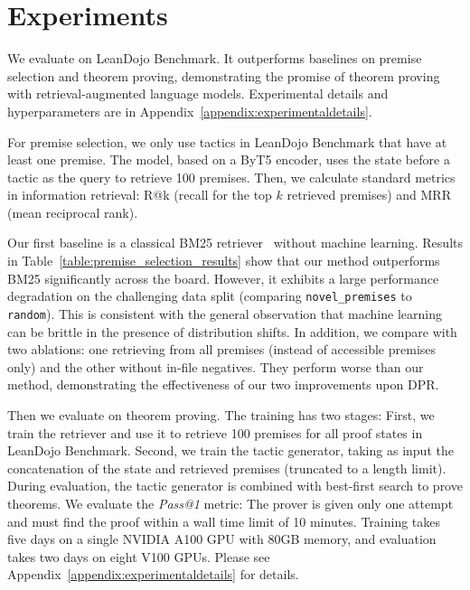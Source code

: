 
\section{Experiments}
\label{sec:experiments}

We evaluate {\name} on LeanDojo Benchmark. It outperforms baselines on premise selection and theorem proving, demonstrating the promise of theorem proving with retrieval-augmented language models. Experimental details and hyperparameters are in Appendix~\ref{appendix:experimentaldetails}.



For premise selection, we only use tactics in LeanDojo Benchmark that have at least one premise. The model, based on a ByT5 encoder, uses the state before a tactic as the query to retrieve 100 premises. Then, we calculate standard metrics in information retrieval: R@k (recall for the top $k$ retrieved premises) and MRR (mean reciprocal rank). 


Our first baseline is a classical BM25 retriever~\cite{robertson2009probabilistic} without machine learning. Results in Table~\ref{table:premise_selection_results} show that our method outperforms BM25 significantly across the board. However, it exhibits a large performance degradation on the challenging data split (comparing \texttt{novel\_premises} to \texttt{random}). This is consistent with the general observation that machine learning can be brittle in the presence of distribution shifts. In addition, we compare with two ablations: one retrieving from all premises (instead of accessible premises only) and the other without in-file negatives. They perform worse than our method, demonstrating the effectiveness of our two improvements upon DPR.



Then we evaluate {\name} on theorem proving. The training has two stages: First, we train the retriever and use it to retrieve 100 premises for all proof states in LeanDojo Benchmark. Second, we train the tactic generator, taking as input the concatenation of the state and retrieved premises (truncated to a length limit). During evaluation, the tactic generator is combined with best-first search to prove theorems. We evaluate the \emph{Pass@1} metric: The prover is given only one attempt and must find the proof within a wall time limit of 10 minutes. Training takes five days on a single NVIDIA A100 GPU with 80GB memory, and evaluation takes two days on eight V100 GPUs. Please see Appendix~\ref{appendix:experimentaldetails} for details.


